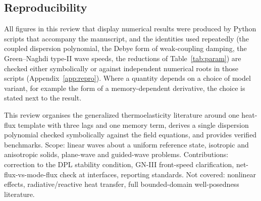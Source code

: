 \subsection{Reproducibility}
All figures in this review that display numerical results were produced by Python scripts that accompany the manuscript, and the identities used repeatedly (the coupled dispersion polynomial, the Debye form of weak-coupling damping, the Green--Naghdi type-II wave speeds, the reductions of Table~\ref{tab:param}) are checked either symbolically or against independent numerical roots in those scripts (Appendix~\ref{app:repro}). Where a quantity depends on a choice of model variant, for example the form of a memory-dependent derivative, the choice is stated next to the result.

\begin{summarybox}[Summary]
This review organises the generalized thermoelasticity literature around one heat-flux template with three lags and one memory term, derives a single dispersion polynomial checked symbolically against the field equations, and provides verified benchmarks. Scope: linear waves about a uniform reference state, isotropic and anisotropic solids, plane-wave and guided-wave problems. Contributions: correction to the DPL stability condition, GN-III front-speed clarification, net-flux-vs-mode-flux check at interfaces, reporting standards. Not covered: nonlinear effects, radiative/reactive heat transfer, full bounded-domain well-posedness literature.
\end{summarybox}
